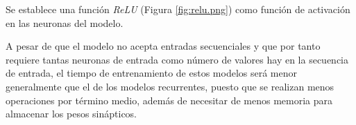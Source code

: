 
Se establece una función \textit{ReLU} (Figura \ref{fig:relu.png}) como función
de activación en las neuronas del modelo.


A pesar de que el modelo no acepta entradas secuenciales y que por tanto requiere 
tantas neuronas de entrada como número de valores hay en la secuencia de entrada,
el tiempo de entrenamiento de estos modelos será menor generalmente que el de los
modelos recurrentes, puesto que se realizan menos operaciones por término medio,
además de necesitar de menos memoria para almacenar los pesos sinápticos.

